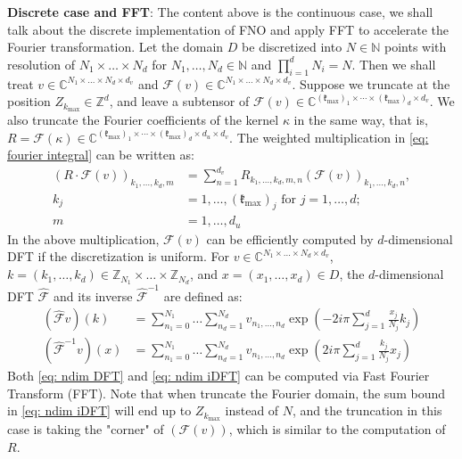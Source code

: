 \documentclass{article}
\begin{document}
\noindent\textbf{Discrete case and FFT}: The content above is the continuous case, we shall talk about the discrete implementation of FNO and apply FFT to accelerate the Fourier transformation. Let the domain $D$ be discretized into $N\in\mathbb{N}$ points with resolution of $N_1\times\dots\times N_d$ for $N_1,\dots,N_d\in\mathbb{N}$ and $\prod_{i=1}^d N_i=N$. Then we shall treat $v\in\mathbb{C}^{N_1\times\dots\times N_d\times d_v}$ and $\mathcal{F}(v)\in\mathbb{C}^{N_1\times\dots\times N_d\times d_v}$. Suppose we truncate at the position $Z_{k_{\max}}\in\mathbb{Z}^d$, and leave a subtensor of $\mathcal{F}(v)\in\mathbb{C}^{(\mathfrak{k}_{\max})_1\times\cdots\times (\mathfrak{k}_{\max})_d\times d_v}$. We also truncate the Fourier coefficients of the kernel $\kappa$ in the same way, that is, $R = \mathcal{F}(\kappa)\in\mathbb{C}^{(\mathfrak{k}_{\max})_1\times\cdots\times (\mathfrak{k}_{\max})_d\times d_u\times d_v}$. The weighted multiplication in \ref{eq: fourier integral} can be written as:
\begin{align}
    (R\cdot \mathcal{F}(v))_{k_1,\dots,k_d,m} &= \sum^{d_v}_{n=1}R_{k_1,\dots,k_d,m,n}(\mathcal{F}(v))_{k_1,\dots,k_d,n}, \label{eq: kernel multi}\\
    k_j &= 1,\dots,(\mathfrak{k}_{\max})_j\text{ for } j=1, \dots, d; \\
    m &= 1,\dots,d_u
\end{align}
In the above multiplication, $\mathcal{F}(v)$ can be efficiently computed by $d$-dimensional DFT if the discretization is uniform. For $v\in\mathbb{C}^{N_1\times\dots\times N_d\times d_v}$, $k=(k_1,\dots,k_d)\in\mathbb{Z}_{N_1}\times\dots\times\mathbb{Z}_{N_d}$, and $x=(x_1,\dots,x_d)\in D$, the $d$-dimensional DFT $\hat{\mathcal{F}}$ and its inverse $\hat{\mathcal{F}}^{-1}$ are defined as:
\begin{align}
    (\hat{\mathcal{F}}v)(k) &= \sum_{n_1=0}^{N_1}\dots\sum_{n_d=1}^{N_d}v_{n_1,\dots,n_d}\exp(-2i\pi\sum_{j=1}^{d}\frac{x_j}{N_j}k_j) \label{eq: ndim DFT}\\
    (\hat{\mathcal{F}}^{-1}v)(x) &= \sum_{n_1=0}^{N_1}\dots\sum_{n_d=1}^{N_d}v_{n_1,\dots,n_d}\exp(2i\pi\sum_{j=1}^{d}\frac{k_j}{N_j}x_j) \label{eq: ndim iDFT}
\end{align}
Both \ref{eq: ndim DFT} and \ref{eq: ndim iDFT} can be computed via Fast Fourier Transform (FFT). Note that when truncate the Fourier domain, the sum bound in \ref{eq: ndim iDFT} will end up to $Z_{k_{\max}}$ instead of $N$, and the truncation in this case is taking the "corner" of $(\mathcal{F}(v))$, which is similar to the computation of $R$.
\end{document}
